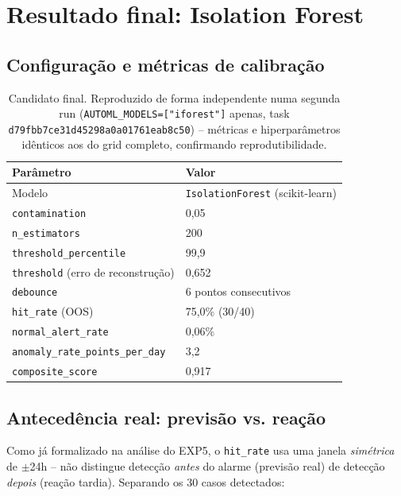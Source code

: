\documentclass[11pt,a4paper]{article}
\begin{document}
\section{Resultado final: Isolation Forest}
\label{sec:resultado}

\subsection{Configuração e métricas de calibração}

\begin{table}[H]
\centering
\begin{tabular}{@{}ll@{}}
\toprule
\textbf{Parâmetro} & \textbf{Valor} \\
\midrule
Modelo & \texttt{IsolationForest} (scikit-learn) \\
\texttt{contamination} & 0,05 \\
\texttt{n\_estimators} & 200 \\
\texttt{threshold\_percentile} & 99,9 \\
\texttt{threshold} (erro de reconstrução) & 0,652 \\
\texttt{debounce} & 6 pontos consecutivos \\
\midrule
\texttt{hit\_rate} (OOS) & 75,0\% (30/40) \\
\texttt{normal\_alert\_rate} & 0,06\% \\
\texttt{anomaly\_rate\_points\_per\_day} & 3,2 \\
\texttt{composite\_score} & 0,917 \\
\bottomrule
\end{tabular}
\caption{Candidato final. Reproduzido de forma independente numa segunda
run (\texttt{AUTOML\_MODELS=["iforest"]} apenas, task
\texttt{d79fbb7ce31d45298a0a01761eab8c50}) -- métricas e hiperparâmetros
idênticos aos do grid completo, confirmando reprodutibilidade.}
\end{table}

\subsection{Antecedência real: previsão vs. reação}

Como já formalizado na análise do EXP5, o \texttt{hit\_rate} usa uma janela
\emph{simétrica} de $\pm$24h -- não distingue detecção \emph{antes} do
alarme (previsão real) de detecção \emph{depois} (reação tardia).
Separando os 30 casos detectados:
\end{document}
